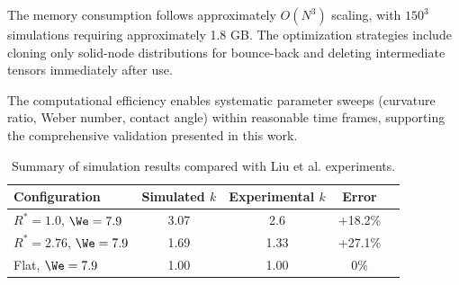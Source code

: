 The memory consumption follows approximately $O(N^3)$ scaling, with $150^3$ simulations requiring approximately 1.8 GB. The optimization strategies include cloning only solid-node distributions for bounce-back and deleting intermediate tensors immediately after use.

The computational efficiency enables systematic parameter sweeps (curvature ratio, Weber number, contact angle) within reasonable time frames, supporting the comprehensive validation presented in this work.

\begin{table}[htbp]
    \centering
    \caption{Summary of simulation results compared with Liu et al. \cite{liu2015symmetry} experiments.}
    \label{tab:comparison}
    \begin{tabular}{lcccc}
        \toprule
        Configuration & Simulated $k$ & Experimental $k$ & Error \\
        \midrule
        $R^* = 1.0$, $\We = 7.9$ & 3.07 & 2.6 & +18.2\% \\
        $R^* = 2.76$, $\We = 7.9$ & 1.69 & 1.33 & +27.1\% \\
        Flat, $\We = 7.9$ & 1.00 & 1.00 & 0\% \\
        \bottomrule
    \end{tabular}
\end{table}